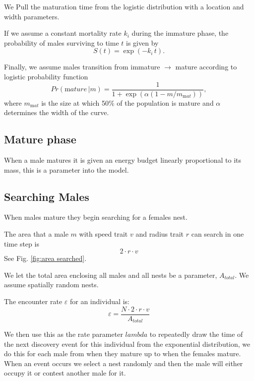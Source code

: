 \documentclass[a4paper,11pt]{article}
\begin{document}
We Pull the maturation time from the logistic distribution with a  location and width parameters.

If we assume a constant mortality rate $k_i$ during the immature phase, the probability of males surviving to time $t$ is given by
\begin{equation} \label{eq:surv_immature}
S(t) = \exp(-k_i \, t).
\end{equation}

Finally, we assume males transition from immature $\rightarrow$ mature according to logistic probability function
\begin{equation}\label{eq:allocation}
Pr({\mathrm mature} \, | m) = \frac1{1 + \exp\left(\alpha \left(1 - m / m_{\mathrm mat}\right)\right)},
\end{equation}
where $m_{\mathrm mat}$ is the size at which 50\% of the population is mature and $\alpha$ determines the width of the curve.

\subsection{Mature phase}
When a male matures it is given an energy budget linearly proportional to its mass, this is a parameter into the model.\\


\subsection{Searching Males}
When males mature they begin searching for a females nest.

The area that a male $m$ with speed trait $v$ and radius trait $r$ can search in one time step is
\begin{equation}
    2 \cdot r \cdot v
\end{equation}
See Fig. \ref{fig:area searched}.

We let the total area enclosing all males and all nests be a parameter, $A_{total}$. We assume spatially random nests.

The encounter rate $\varepsilon$ for an individual is:
\begin{equation} \label{eq:encounter rate}
    \varepsilon = \frac {N \cdot 2 \cdot r \cdot v} {A_{total}}
\end{equation}
\citep{Gurarie2012}

We then use this as the rate parameter $lambda$ to repeatedly draw the time of the next discovery event for this individual from the exponential distribution, we do this for each male from when they mature up to when the females mature.
When an event occurs we select a nest randomly and then the male will either occupy it or contest another male for it.
\end{document}
